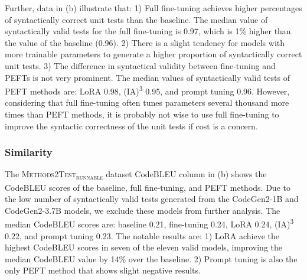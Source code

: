 \documentclass[12pt]{book}
\begin{document}
Further, data in (b) illustrate that: 1) Full fine-tuning achieves higher percentages of syntactically correct unit tests than the baseline. The median value of syntactically valid tests for the full fine-tuning is 0.97, which is 1\% higher than the value of the baseline (0.96). 2) There is a slight tendency for models with more trainable parameters to generate a higher proportion of syntactically correct unit tests. 3) The difference in syntactical validity between fine-tuning and PEFTs is not very prominent. The median values of syntactically valid tests of PEFT methods are: LoRA 0.98, (IA)\textsuperscript{3} 0.95, and prompt tuning 0.96. However, considering that full fine-tuning often tunes parameters several thousand more times than PEFT methods, it is probably not wise to use full fine-tuning to improve the syntactic correctness of the unit tests if cost is a concern.
   
\subsubsection{Similarity}
The \textsc{Methods2Test\textsubscript{runnable}} dataset CodeBLEU column in (b) shows the CodeBLEU scores of the baseline, full fine-tuning, and PEFT methods. Due to the low number of syntactically valid tests generated from the CodeGen2-1B and CodeGen2-3.7B models, we exclude these models from further analysis. The median CodeBLEU scores are: baseline 0.21, fine-tuning 0.24, LoRA 0.24, (IA)\textsuperscript{3} 0.22, and prompt tuning 0.23.
The notable results are: 1) LoRA achieve the highest CodeBLEU scores in seven of the eleven valid models, improving the median CodeBLEU value by 14\% over the baseline. 2) Prompt tuning is also the only PEFT method that shows slight negative results.
\end{document}
